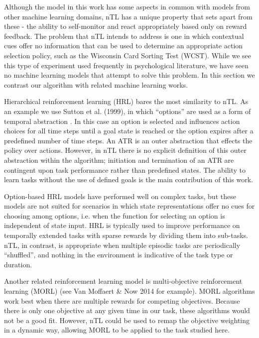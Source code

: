 \documentclass[10pt,letterpaper]{article}
\begin{document}
Although the model in this work has some aspects in common with models from other machine learning domains, nTL has a unique property that sets apart from these - the ability to self-monitor and react appropriately based only on reward feedback. The problem that nTL intends to address is one in which contextual cues offer no information that can be used to determine an appropriate action selection policy, such as the Wisconsin Card Sorting Test (WCST). While we see this type of experiment used frequently in psychological literature, we have seen no machine learning models that attempt to solve this problem. In this section we contrast our algorithm with related machine learning works.

Hierarchical reinforcement learning (HRL) bares the most similarity to nTL. As an example we use Sutton et al. (1999), in which ``options'' are used as a form of temporal abstraction \cite{sutton_between_1999}. In this case an option is selected and influences action choices for all time steps until a goal state is reached or the option expires after a predefined number of time steps. An ATR is an outer abstraction that effects the policy over actions. However, in nTL there is no explicit definition of this outer abstraction within the algorithm; initiation and termination of an ATR are contingent upon task performance rather than predefined states. The ability to learn tasks without the use of defined goals is the main contribution of this work.

Option-based HRL models have performed well on complex tasks, but these models are not suited for scenarios in which state representations offer no cues for choosing among options, i.e. when the function for selecting an option is independent of state input. HRL is typically used to improve performance on temporally extended tasks with sparse rewards by dividing them into sub-tasks. nTL, in contrast, is appropriate when multiple episodic tasks are periodically ``shuffled'', and nothing in the environment is indicative of the task type or duration.

Another related reinforcement learning model is multi-objective reinforcement learning (MORL) (see Van Moffaert \& Now 2014 for example). MORL algorithms work best when there are multiple rewards for competing objectives. Because there is only one objective at any given time in our task, these algorithms would not be a good fit. However, nTL could be used to remap the objective weighting in a dynamic way, allowing MORL to be applied to the task studied here. 
\end{document}

